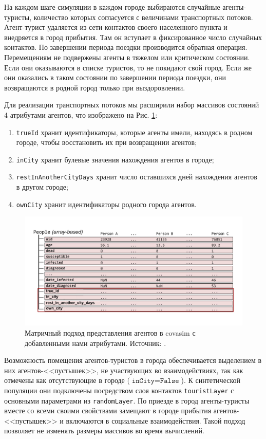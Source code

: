 \documentclass[a4paper,12pt]{article} %
\begin{document}
На каждом шаге симуляции в каждом городе выбираются случайные агенты-туристы, количество которых согласуется с величинами транспортных потоков. Агент-турист удаляется из сети контактов своего населенного пункта и внедряется в город прибытия. Там он вступает в фиксированное число случайных контактов. По завершении периода поездки производится обратная операция. Перемещениям не подвержены агенты в тяжелом или критическом состоянии. Если они оказываются в списке туристов, то не покидают свой город. Если же они оказались в таком состоянии по завершении периода поездки, они возвращаются в родной город только при выздоровлении.

Для реализации транспортных потоков мы расширили набор массивов состояний 4 атрибутами агентов, что изображено на Рис. \ref{pic:array}:
\begin{enumerate}
\item \texttt{trueId} хранит идентификаторы, которые агенты имели, находясь в родном городе, чтобы восстановить их при возвращении агентов;
\item \texttt{inCity} хранит булевые значения нахождения агентов в городе;
\item \texttt{restInAnotherCityDays} хранит число оставшихся дней нахождения агентов в другом городе;
\item \texttt{ownCity} хранит идентификаторы родного города агентов.
\end{enumerate}

\begin{figure}[]
    \centering
    \includegraphics[width=0.8\linewidth]{images/arrays.pdf}
    \caption{Матричный подход представления агентов в \gls{covasim} с добавленными нами атрибутами. Источник: \cite{kerr2021covasim}.}
    \label{pic:array}
\end{figure}

Возможность помещения агентов-туристов в города обеспечивается выделением в них агентов-<<пустышек>>, не участвующих во взаимодействиях, так как отмечены как отсутствующие в городе (\(\texttt{inCity} = \texttt{False}\)). К синтетической популяции они подключены посредством слоя контактов \texttt{touristLayer} с основными параметрами из \texttt{randomLayer}. По приезде в город агенты-туристы вместе со всеми своими свойствами замещают в городе прибытия агентов-<<пустышек>> и включаются в социальные взаимодействия. Такой подход позволяет не изменять размеры массивов во время вычислений.
\end{document}
